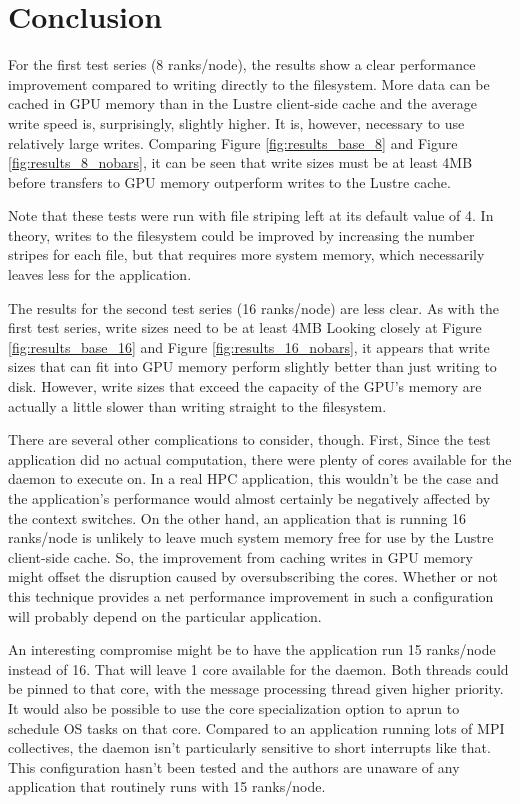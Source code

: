 \section{Conclusion}
\label{sec:conclusion}

For the first test series (8 ranks/node), the results show a clear performance improvement compared to writing directly to the filesystem.   More data can be cached in GPU memory than in the Lustre client-side cache and the average write speed is, surprisingly, slightly higher.  It is, however, necessary to use relatively large writes.   Comparing Figure \ref{fig:results_base_8} and Figure \ref{fig:results_8_nobars},  it can be seen that write sizes must be at least 4MB before transfers to GPU memory outperform writes to the Lustre cache.

Note that these tests were run with file striping left at its default value of 4.  In theory, writes to the filesystem could be improved by increasing the number stripes for each file, but that requires more system memory, which necessarily leaves less for the application.

The results for the second test series (16 ranks/node) are less clear.  As with the first test series, write sizes need to be at least 4MB Looking closely at Figure \ref{fig:results_base_16} and Figure \ref{fig:results_16_nobars}, it appears that write sizes that can fit into GPU memory perform slightly better than just writing to disk.  However, write sizes that exceed the capacity of the GPU's memory are actually a little slower than writing straight to the filesystem.

There are several other complications to consider, though.
First, Since the test application did no actual computation, there were plenty of cores available for the daemon to execute on.  In a real HPC application, this wouldn't be the case and the application's performance would almost certainly be negatively affected by the context switches.  On the other hand, an application that is running 16 ranks/node is unlikely to leave much system memory free for use by the Lustre client-side cache.  So, the improvement from caching writes in GPU memory might offset the disruption caused by oversubscribing the cores.  Whether or not this technique provides a net performance improvement in such a configuration will probably depend on the particular application.

An interesting compromise might be to have the application run 15 ranks/node instead of 16.  That will leave 1 core available for the daemon.  Both threads could be pinned to that core, with the message processing thread given higher priority.  It would also be possible to use the  core specialization option to aprun to schedule OS tasks on that core.  Compared to an application running lots of MPI collectives, the daemon isn't particularly sensitive to short interrupts like that.  This configuration hasn't been tested and the authors are unaware of any application that routinely runs with 15 ranks/node.

